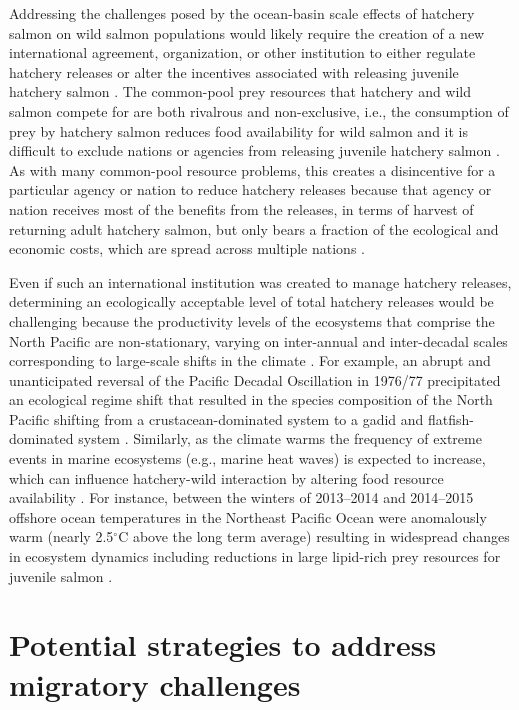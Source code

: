 Addressing the challenges posed by the ocean-basin scale effects of hatchery
salmon on wild salmon populations would likely require the creation of a new
international agreement, organization, or other institution to either regulate
hatchery releases or alter the incentives associated with releasing juvenile
hatchery salmon \citep{Holt2008b}. The common-pool prey resources that hatchery
and wild salmon compete for are both rivalrous and non-exclusive, i.e., the
consumption of prey by hatchery salmon reduces food availability for wild salmon
and it is difficult to exclude nations or agencies from releasing juvenile
hatchery salmon \citep{Hardin1968a}. As with many common-pool resource problems,
this creates a disincentive for a particular agency or nation to reduce hatchery
releases because that agency or nation receives most of the benefits from the
releases, in terms of harvest of returning adult hatchery salmon, but only bears
a fraction of the ecological and economic costs, which are spread across
multiple nations \citep{Holt2008b}.

Even if such an international institution was created to manage hatchery
releases, determining an ecologically acceptable level of total hatchery
releases would be challenging because the productivity levels of the ecosystems
that comprise the North Pacific are non-stationary, varying on inter-annual and
inter-decadal scales corresponding to large-scale shifts in the climate
\citep{Hare1999a, Chavez2003a}. For example, an abrupt and unanticipated
reversal of the Pacific Decadal Oscillation in 1976/77 precipitated an
ecological regime shift that resulted in the species composition of the North
Pacific shifting from a crustacean-dominated system to a gadid and
flatfish-dominated system \citep{Mantua1997a, Anderson1999a, Mueter2000a}.
Similarly, as the climate warms the frequency of extreme events in marine
ecosystems (e.g., marine heat waves) is expected to increase, which can
influence hatchery-wild interaction by altering food resource availability
\citep{Jentsch2007, DiLorenzo2016}. For instance, between the winters of
2013--2014 and 2014--2015 offshore ocean temperatures in the Northeast Pacific
Ocean were anomalously warm (nearly 2.5$^{\circ}$C above the long term average)
resulting in widespread changes in ecosystem dynamics including reductions in
large lipid-rich prey resources for juvenile salmon \citep{Bond2015,
DiLorenzo2016}.



\section{Potential strategies to address migratory challenges}

